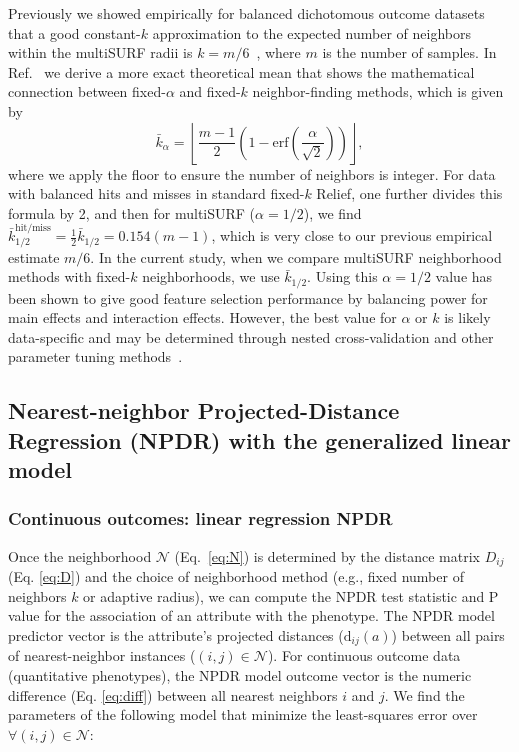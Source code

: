 \documentclass[10pt]{article}
\begin{document}
Previously we showed empirically for balanced dichotomous outcome datasets that a good constant-$k$ approximation to the expected number of neighbors within the multiSURF radii is $k=m/6$~\cite{stir}, where $m$ is the number of samples.
In Ref.~\cite{bod} we derive a more exact theoretical mean that shows the mathematical connection between fixed-$\alpha$ and fixed-$k$ neighbor-finding methods, which is given by 
\begin{equation}\label{eq:kbar}
{\bar{k}}_{\alpha} = \left \lfloor \frac{m-1}{2}  \left( 1 - \mathrm{erf}\left( \frac{\alpha}{\sqrt{2}} \right) \right) \right \rfloor,
\end{equation}
where we apply the floor to ensure the number of neighbors is integer.
For data with balanced hits and misses in standard fixed-$k$ Relief, one further divides this formula by 2, and then for multiSURF ($\alpha=1/2$), we find $\bar{k}_{1/2}^{\text{hit/miss}} = \frac{1}{2}\bar{k}_{1/2} = 0.154 (m-1)$, which is very close to our previous empirical estimate $m/6$.
In the current study, when we compare multiSURF neighborhood methods with fixed-$k$ neighborhoods, we use $\bar{k}_{1/2}$.
Using this $\alpha=1/2$ value has been shown to give good feature selection performance by balancing power for main effects and interaction effects.
However, the best value for $\alpha$ or $k$ is likely data-specific and may be determined through nested cross-validation and other parameter tuning methods~\cite{bod}.

\subsection{Nearest-neighbor Projected-Distance Regression (NPDR) with the generalized linear model}

\subsubsection{Continuous outcomes: linear regression NPDR}\label{sec:regress}

Once the neighborhood $\mathcal{N}$ (Eq.~\ref{eq:N}) is determined by the distance matrix $D_{ij}$ (Eq. \ref{eq:D}) and the choice of neighborhood method (e.g., fixed number of neighbors $k$ or adaptive radius), we can compute the NPDR test statistic and P value for the association of an attribute with the phenotype.
The NPDR model predictor vector is the attribute's projected distances ($\text{d}_{ij}(a)$) between all pairs of nearest-neighbor instances ($(i,j) \in \mathcal{N}$).
For continuous outcome data (quantitative phenotypes), the NPDR model outcome vector is the numeric difference (Eq. \ref{eq:diff}) between all nearest neighbors $i$ and $j$.
We find the parameters of the following model that minimize the least-squares error over $\forall(i,j) \in \mathcal{N}$: 
\end{document}
